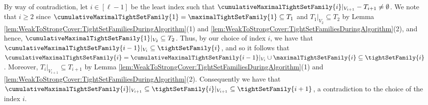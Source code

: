         \item By way of contradiction, let $i \in [\ell - 1]$ be the least index such that $\cumulativeMaximalTightSetFamily{i}|_{V_{i+1}} - T_{i+1} \not = \emptyset$. We note that $i \geq 2$ since $\cumulativeMaximalTightSetFamily{1} = \maximalTightSetFamily{1}\subseteq T_1$ and $T_1|_{V_2}\subseteq T_2$ by Lemma  \ref{lem:WeakToStrongCover:TightSetFamiliesDuringAlgorithm}(1) and \ref{lem:WeakToStrongCover:TightSetFamiliesDuringAlgorithm}(2), and hence, $\cumulativeMaximalTightSetFamily{1}|_{V_2}\subseteq T_2$. Thus, by our choice of index $i$, we have that $\cumulativeMaximalTightSetFamily{i-1}|_{V_i} \subseteq \tightSetFamily{i}$, and so it follows that $\cumulativeMaximalTightSetFamily{i} = \cumulativeMaximalTightSetFamily{i-1}|_{V_i} \cup \maximalTightSetFamily{i} \subseteq \tightSetFamily{i}$. Moreover, $T_i|_{V_{i+1}}\subseteq T_{i+1}$ by Lemma  \ref{lem:WeakToStrongCover:TightSetFamiliesDuringAlgorithm}(1) and \ref{lem:WeakToStrongCover:TightSetFamiliesDuringAlgorithm}(2). Consequently we have that $\cumulativeMaximalTightSetFamily{i}|_{V_{i+1}} \subseteq \tightSetFamily{i}|_{V_{i+1}} \subseteq \tightSetFamily{i+1}$, a contradiction to the choice of the index $i$. 

